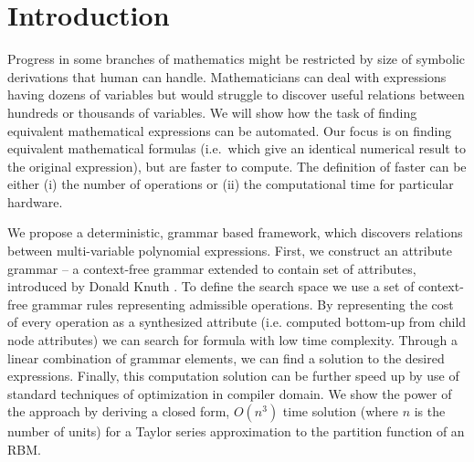 \section{Introduction} \label{introduction} 

Progress in some branches of
mathematics might be restricted by size of symbolic derivations that human can
handle. Mathematicians can deal with expressions having dozens of
variables but would struggle to discover useful relations between hundreds or
thousands of variables. We will show how the task of finding equivalent
mathematical expressions can be automated. Our focus is on finding equivalent
mathematical formulas (i.e.~which give an identical numerical result
to the original expression),
but are faster to compute. The definition
of faster can be either (i) the number of operations or (ii) the computational time
for particular hardware.

We propose a deterministic, grammar based framework, which discovers
relations between multi-variable polynomial expressions. First, we
construct an attribute grammar -- a context-free grammar extended to
contain set of attributes, introduced by Donald Knuth
\cite{knuth1968semantics}. To define the search space we use a set of
context-free grammar rules representing admissible operations. By
representing the cost of every operation as a synthesized attribute
(i.e. computed bottom-up from child node attributes) we can search for
formula with low time complexity. Through a linear combination of
grammar elements, we can find a solution to the desired
expressions. Finally, this computation solution can be further speed
up by use of standard techniques of optimization in compiler
domain. We show the power of the approach by deriving a closed form,
$O(n^3)$ time solution (where $n$ is the number of units) for a Taylor
series approximation to the partition function of an RBM.






